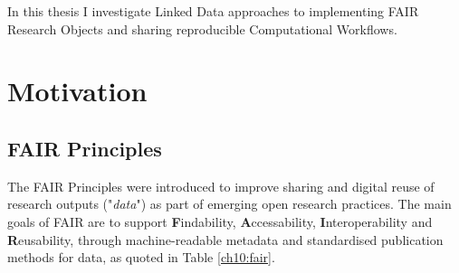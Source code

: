 In this thesis I investigate Linked Data approaches to implementing FAIR Research Objects and sharing reproducible Computational Workflows.

\section{Motivation}

\subsection{FAIR Principles}

The FAIR Principles \cite{Wilkinson 2016} were introduced to improve sharing and digital reuse of research outputs ("\emph{data}") as part of emerging open research practices. The main goals of FAIR are to support \textbf{F}indability, \textbf{A}ccessability, \textbf{I}nteroperability and \textbf{R}eusability, through machine-readable metadata and standardised publication methods for data, as quoted in Table \vref{ch10:fair}.

